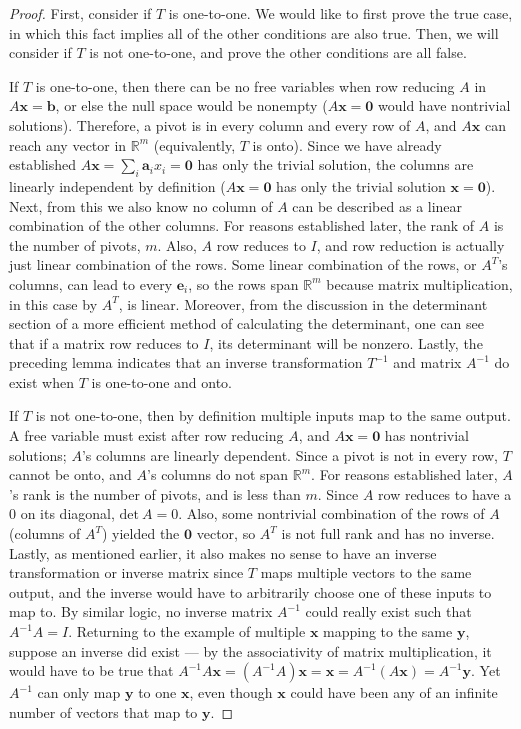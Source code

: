\documentclass[draft,12pt]{report}
\renewcommand{\vec}[1]{\mathbf{#1}}
\begin{document}
\begin{proof}
    First, consider if $T$ is one-to-one. We would like to first prove the true case, in which this fact implies all of the other conditions are also true. Then, we will consider if $T$ is not one-to-one, and prove the other conditions are all false.
    
    If $T$ is one-to-one, then there can be no free variables when row reducing $A$ in $A\vec{x} = \vec{b}$, or else the null space would be nonempty ($A\vec{x} = \vec{0}$ would have nontrivial solutions). Therefore, a pivot is in every column and every row of $A$, and $A\vec{x}$ can reach any vector in $\mathbb R^m$ (equivalently, $T$ is onto). Since we have already established $A\vec{x} = \sum_i \vec{a}_i x_i = \vec{0}$ has only the trivial solution, the columns are linearly independent by definition ($A\vec{x} = \vec{0}$ has only the trivial solution $\vec{x} = \vec{0}$). Next, from this we also know no column of $A$ can be described as a linear combination of the other columns. For reasons established later, the rank of $A$ is the number of pivots, $m$. Also, $A$ row reduces to $I$, and row reduction is actually just linear combination of the rows. Some linear combination of the rows, or $A^T$'s columns, can lead to every $\vec{e}_i$, so the rows span $\mathbb R^m$ because matrix multiplication, in this case by $A^T$, is linear. Moreover, from the discussion in the determinant section of a more efficient method of calculating the determinant, one can see that if a matrix row reduces to $I$, its determinant will be nonzero. Lastly, the preceding lemma indicates that an inverse transformation $T^{-1}$ and matrix $A^{-1}$ do exist when $T$ is one-to-one and onto.
    
    If $T$ is not one-to-one, then by definition multiple inputs map to the same output. A free variable must exist after row reducing $A$, and $A\vec{x} = \vec{0}$ has nontrivial solutions; $A$'s columns are linearly dependent. Since a pivot is not in every row, $T$ cannot be onto, and $A$'s columns do not span $\mathbb R^m$. For reasons established later, $A$'s rank is the number of pivots, and is less than $m$. Since $A$ row reduces to have a 0 on its diagonal, $\mathrm{det\ } A = 0$. Also, some nontrivial combination of the rows of $A$ (columns of $A^T$) yielded the $\vec{0}$ vector, so $A^T$ is not full rank and has no inverse. Lastly, as mentioned earlier, it also makes no sense to have an inverse transformation or inverse matrix since $T$ maps multiple vectors to the same output, and the inverse would have to arbitrarily choose one of these inputs to map to. By similar logic, no inverse matrix $A^{-1}$ could really exist such that $A^{-1}A = I$. Returning to the example of multiple $\vec{x}$ mapping to the same $\vec{y}$, suppose an inverse did exist --- by the associativity of matrix multiplication, it would have to be true that $A^{-1}A\vec{x} = (A^{-1}A)\vec{x} = \vec{x} = A^{-1}(A\vec{x}) = A^{-1}\vec{y}$. Yet $A^{-1}$ can only map $\vec{y}$ to one $\vec{x}$, even though $\vec{x}$ could have been any of an infinite number of vectors that map to $\vec{y}$.
\end{proof}
\end{document}
